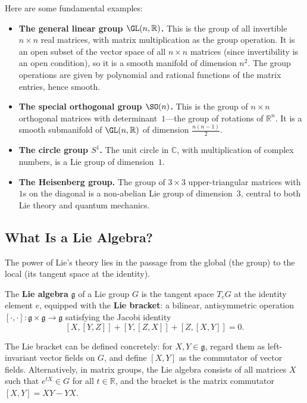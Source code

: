 Here are some fundamental examples:

\begin{itemize}
    \item \textbf{The general linear group $\GL(n,\mathbb{R})$.} This is the group of all invertible $n \times n$ real matrices, with matrix multiplication as the group operation. It is an open subset of the vector space of all $n \times n$ matrices (since invertibility is an open condition), so it is a smooth manifold of dimension $n^2$. The group operations are given by polynomial and rational functions of the matrix entries, hence smooth.

    \item \textbf{The special orthogonal group $\SO(n)$.} This is the group of $n \times n$ orthogonal matrices with determinant~$1$---the group of rotations of $\mathbb{R}^n$. It is a smooth submanifold of $\GL(n,\mathbb{R})$ of dimension $\tfrac{n(n-1)}{2}$.

    \item \textbf{The circle group $S^1$.} The unit circle in $\mathbb{C}$, with multiplication of complex numbers, is a Lie group of dimension~$1$.

    \item \textbf{The Heisenberg group.} The group of $3 \times 3$ upper-triangular matrices with $1$s on the diagonal is a non-abelian Lie group of dimension~$3$, central to both Lie theory and quantum mechanics.
\end{itemize}

\subsection{What Is a Lie Algebra?}

The power of Lie's theory lies in the passage from the global (the group) to the local (its tangent space at the identity).

\begin{definition}
The \textbf{Lie algebra} $\mathfrak{g}$ of a Lie group $G$ is the tangent space $T_e G$ at the identity element $e$, equipped with the \textbf{Lie bracket}: a bilinear, antisymmetric operation $[\cdot, \cdot] \colon \mathfrak{g} \times \mathfrak{g} \to \mathfrak{g}$ satisfying the Jacobi identity
\[
[X,[Y,Z]] + [Y,[Z,X]] + [Z,[X,Y]] = 0.
\]
\end{definition}

The Lie bracket can be defined concretely: for $X, Y \in \mathfrak{g}$, regard them as left-invariant vector fields on $G$, and define $[X,Y]$ as the commutator of vector fields. Alternatively, in matrix groups, the Lie algebra consists of all matrices $X$ such that $e^{tX} \in G$ for all $t \in \mathbb{R}$, and the bracket is the matrix commutator $[X,Y] = XY - YX$.

